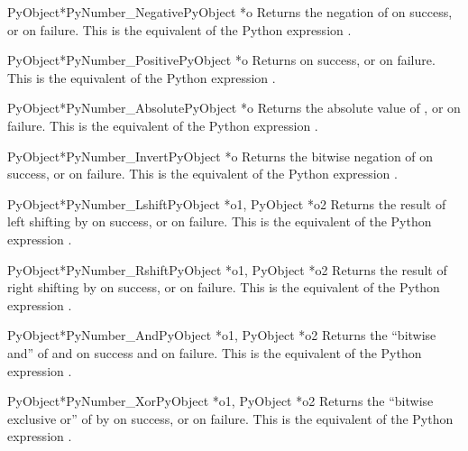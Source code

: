 \begin{cfuncdesc}{PyObject*}{PyNumber_Negative}{PyObject *o}
  Returns the negation of  on success, or \NULL{} on failure.
  This is the equivalent of the Python expression .
\end{cfuncdesc}


\begin{cfuncdesc}{PyObject*}{PyNumber_Positive}{PyObject *o}
  Returns  on success, or \NULL{} on failure.  This is the
  equivalent of the Python expression .
\end{cfuncdesc}


\begin{cfuncdesc}{PyObject*}{PyNumber_Absolute}{PyObject *o}
  Returns the absolute value of , or \NULL{} on failure.  This
  is the equivalent of the Python expression .
\end{cfuncdesc}


\begin{cfuncdesc}{PyObject*}{PyNumber_Invert}{PyObject *o}
  Returns the bitwise negation of  on success, or \NULL{} on
  failure.  This is the equivalent of the Python expression
  .
\end{cfuncdesc}


\begin{cfuncdesc}{PyObject*}{PyNumber_Lshift}{PyObject *o1, PyObject *o2}
  Returns the result of left shifting  by  on success,
  or \NULL{} on failure.  This is the equivalent of the Python
  expression .
\end{cfuncdesc}


\begin{cfuncdesc}{PyObject*}{PyNumber_Rshift}{PyObject *o1, PyObject *o2}
  Returns the result of right shifting  by  on
  success, or \NULL{} on failure.  This is the equivalent of the
  Python expression .
\end{cfuncdesc}


\begin{cfuncdesc}{PyObject*}{PyNumber_And}{PyObject *o1, PyObject *o2}
  Returns the ``bitwise and'' of  and  on success and
  \NULL{} on failure. This is the equivalent of the Python expression
  .
\end{cfuncdesc}


\begin{cfuncdesc}{PyObject*}{PyNumber_Xor}{PyObject *o1, PyObject *o2}
  Returns the ``bitwise exclusive or'' of  by  on
  success, or \NULL{} on failure.  This is the equivalent of the
  Python expression .
\end{cfuncdesc}

